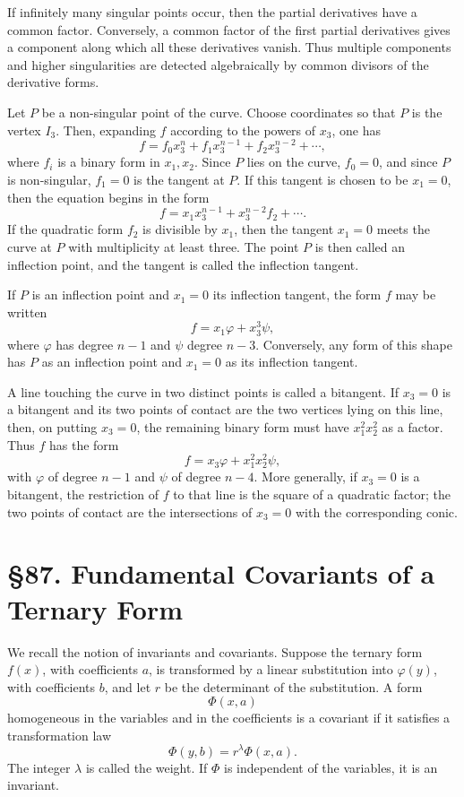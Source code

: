 \documentclass[11pt,a4paper]{book}
\newcommand{\webersection}[2]{\clearpage\section*{\S #1. #2}}
\begin{document}
If infinitely many singular points occur, then the partial derivatives have a common factor.  Conversely, a common factor of the first partial derivatives gives a component along which all these derivatives vanish.  Thus multiple components and higher singularities are detected algebraically by common divisors of the derivative forms.

Let \(P\) be a non-singular point of the curve.  Choose coordinates so that \(P\) is the vertex \(I_3\).  Then, expanding \(f\) according to the powers of \(x_3\), one has
\[
f=f_0x_3^n+f_1x_3^{n-1}+f_2x_3^{n-2}+\cdots ,
\]
where \(f_i\) is a binary form in \(x_1,x_2\).  Since \(P\) lies on the curve, \(f_0=0\), and since \(P\) is non-singular, \(f_1=0\) is the tangent at \(P\).  If this tangent is chosen to be \(x_1=0\), then the equation begins in the form
\[
f=x_1x_3^{n-1}+x_3^{n-2}f_2+\cdots .
\]
If the quadratic form \(f_2\) is divisible by \(x_1\), then the tangent \(x_1=0\) meets the curve at \(P\) with multiplicity at least three.  The point \(P\) is then called an inflection point, and the tangent is called the inflection tangent.

If \(P\) is an inflection point and \(x_1=0\) its inflection tangent, the form \(f\) may be written
\[
f=x_1\varphi+x_3^3\psi,
\]
where \(\varphi\) has degree \(n-1\) and \(\psi\) degree \(n-3\).  Conversely, any form of this shape has \(P\) as an inflection point and \(x_1=0\) as its inflection tangent.

A line touching the curve in two distinct points is called a bitangent.  If \(x_3=0\) is a bitangent and its two points of contact are the two vertices lying on this line, then, on putting \(x_3=0\), the remaining binary form must have \(x_1^2x_2^2\) as a factor.  Thus \(f\) has the form
\[
f=x_3\varphi+x_1^2x_2^2\psi,
\]
with \(\varphi\) of degree \(n-1\) and \(\psi\) of degree \(n-4\).  More generally, if \(x_3=0\) is a bitangent, the restriction of \(f\) to that line is the square of a quadratic factor; the two points of contact are the intersections of \(x_3=0\) with the corresponding conic.

\webersection{87}{Fundamental Covariants of a Ternary Form}

We recall the notion of invariants and covariants.  Suppose the ternary form \(f(x)\), with coefficients \(a\), is transformed by a linear substitution into \(\varphi(y)\), with coefficients \(b\), and let \(r\) be the determinant of the substitution.  A form
\[
\Phi(x,a)
\]
homogeneous in the variables and in the coefficients is a covariant if it satisfies a transformation law
\[
\Phi(y,b)=r^\lambda\Phi(x,a).
\]
The integer \(\lambda\) is called the weight.  If \(\Phi\) is independent of the variables, it is an invariant.
\end{document}
